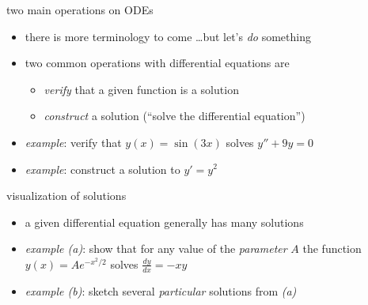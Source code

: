 \documentclass{beamer}
\begin{document}
\begin{frame}{two main operations on ODEs}

\begin{itemize}
\item there is more terminology to come \dots but let's \emph{do} something
\item two common operations with differential equations are
    \begin{itemize}
    \item \alert{\emph{verify}} that a given function is a solution
    \item \alert{\emph{construct}} a solution (``solve the differential equation'')
    \end{itemize}

\item \emph{example}:  verify that $y(x) = \sin(3 x)$ solves $y''+9y=0$

\vspace{10mm}
\item \emph{example}:  construct a solution to $y'=y^2$

\vspace{30mm}
\end{itemize}
\end{frame}

\begin{frame}{visualization of solutions}

\begin{itemize}
\item a given differential equation generally has many solutions
\item \emph{example (a)}: show that for any value of the \emph{parameter} $A$ the function $y(x) = A e^{-x^2/2}$ solves $\frac{dy}{dx} = - x y$

\vspace{15mm}
\item \emph{example (b)}: sketch several \emph{particular} solutions from \emph{(a)}

\vspace{25mm}

\phantom{foo}
\end{itemize}
\end{frame}
\end{document}

